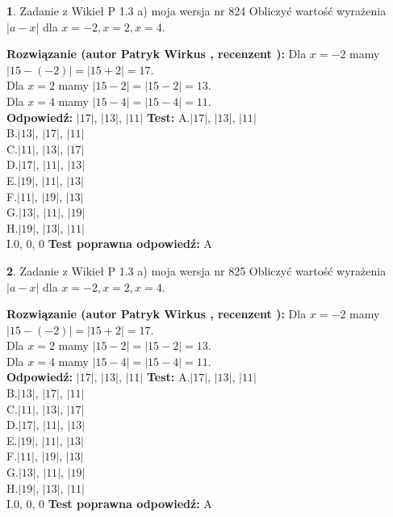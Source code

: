 \documentclass[12pt, a4paper]{article}
\theoremstyle{definition} %
\newtheorem{zad}{}
\newcommand{\zadStart}[1]{\begin{zad}#1\newline}
\newcommand{\zadStop}{\end{zad}}
\newcommand{\rozwStart}[2]{\noindent \textbf{Rozwiązanie (autor #1 , recenzent #2): }\newline}
\newcommand{\rozwStop}{\newline}
\newcommand{\odpStart}{\noindent \textbf{Odpowiedź:}\newline}
\newcommand{\odpStop}{\newline}
\newcommand{\testStart}{\noindent \textbf{Test:}\newline}
\newcommand{\testStop}{\newline}
\newcommand{\kluczStart}{\noindent \textbf{Test poprawna odpowiedź:}\newline}
\newcommand{\kluczStop}{\newline}
\begin{document}
\zadStart{Zadanie z Wikieł P 1.3 a) moja wersja nr 824}
Obliczyć wartość wyrażenia $|a - x|$ dla $x=-2,x=2,x=4$.
\zadStop
\rozwStart{Patryk Wirkus}{}
Dla $x = -2$ mamy $|15 - (-2)| = |15 + 2| = 17$.\\
Dla $x = 2$ mamy $|15 - 2| = |15 - 2| = 13$.\\
Dla $x = 4$ mamy $|15 - 4| = |15 - 4| = 11$.\\
\rozwStop
\odpStart
$|17|$, $|13|$, $|11|$
\odpStop
\testStart
A.$|17|$, $|13|$, $|11|$\\
B.$|13|$, $|17|$, $|11|$\\
C.$|11|$, $|13|$, $|17|$\\
D.$|17|$, $|11|$, $|13|$\\
E.$|19|$, $|11|$, $|13|$\\
F.$|11|$, $|19|$, $|13|$\\
G.$|13|$, $|11|$, $|19|$\\
H.$|19|$, $|13|$, $|11|$\\
I.$0$, $0$, $0$
\testStop
\kluczStart
A
\kluczStop



\zadStart{Zadanie z Wikieł P 1.3 a) moja wersja nr 825}
Obliczyć wartość wyrażenia $|a - x|$ dla $x=-2,x=2,x=4$.
\zadStop
\rozwStart{Patryk Wirkus}{}
Dla $x = -2$ mamy $|15 - (-2)| = |15 + 2| = 17$.\\
Dla $x = 2$ mamy $|15 - 2| = |15 - 2| = 13$.\\
Dla $x = 4$ mamy $|15 - 4| = |15 - 4| = 11$.\\
\rozwStop
\odpStart
$|17|$, $|13|$, $|11|$
\odpStop
\testStart
A.$|17|$, $|13|$, $|11|$\\
B.$|13|$, $|17|$, $|11|$\\
C.$|11|$, $|13|$, $|17|$\\
D.$|17|$, $|11|$, $|13|$\\
E.$|19|$, $|11|$, $|13|$\\
F.$|11|$, $|19|$, $|13|$\\
G.$|13|$, $|11|$, $|19|$\\
H.$|19|$, $|13|$, $|11|$\\
I.$0$, $0$, $0$
\testStop
\kluczStart
A
\kluczStop
\end{document}

